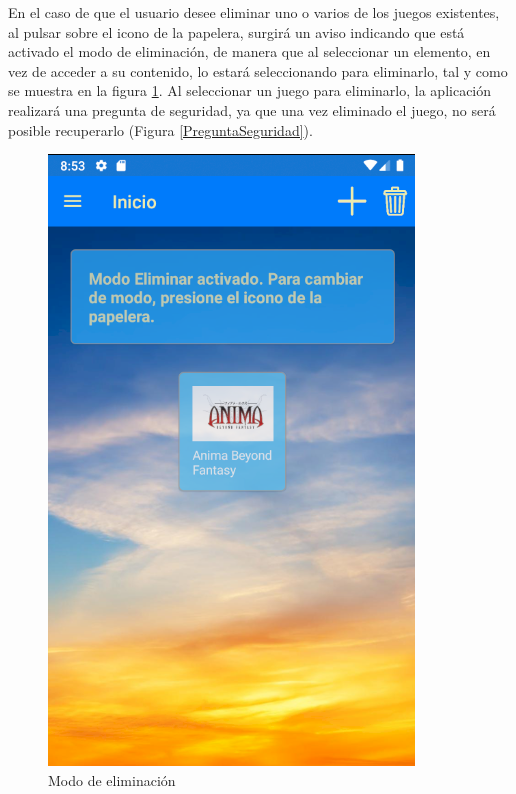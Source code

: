 En el caso de que el usuario desee eliminar uno o varios de los juegos existentes, al pulsar sobre el 
icono de la papelera, surgirá un aviso indicando que está activado el modo de eliminación, de manera que 
al seleccionar un elemento, en vez de acceder a su contenido, lo estará seleccionando para eliminarlo, tal 
y como se muestra en la figura \ref*{ModoEliminacion}. Al seleccionar un juego para eliminarlo, 
la aplicación realizará una pregunta de seguridad, ya que una vez eliminado el juego, no será posible 
recuperarlo (Figura \ref{PreguntaSeguridad}).

\begin{figure}[H]
    \centering
    \includegraphics[scale=0.3]{Figures/Capturas/ModoEliminar.png}
    \caption{Modo de eliminación}
    \label{ModoEliminacion}    
\end{figure}

